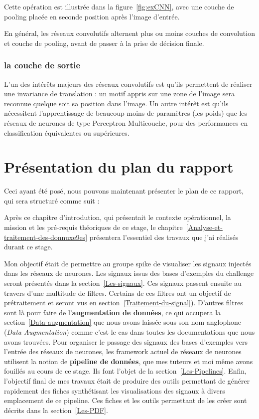 Cette opération est illustrée dans la figure~\ref{fig:exCNN}, avec une couche
de pooling placée en seconde position après l'image d'entrée.

En général, les réseaux convolutifs alternent plus ou moins couches de
convolution et couche de pooling, avant de passer à la prise de décision finale.

\subsubsection{la couche de sortie}



L'un des intérêts majeurs des réseaux convolutifs est qu'ils permettent de
réaliser une invariance de translation :
un motif appris sur une zone de l'image sera reconnue quelque soit sa position
dans l'image.
Un autre intérêt est qu'ils nécessitent l'apprentissage de beaucoup moins de
paramètres (les poids) que les réseaux de neurones de type Perceptron
Multicouche, pour des performances en classification équivalentes ou
supérieures.

\hypertarget{plan}{%
\section{Présentation du plan du rapport}%
\label{Présentation du plan du rapport}}

Ceci ayant été posé, nous pouvons maintenant présenter le plan de ce rapport,
qui sera structuré comme suit :

Après ce chapitre d'introdution, qui présentait le contexte opérationnel, la mission et les pré-requis théoriques de ce stage, le
chapitre~\ref{Analyse-et-traitement-des-donnuxe9es} présentera l'essentiel
des travaux que j'ai réalisés durant ce stage.

Mon objectif était de permettre au groupe spike de visualiser les signaux
injectés dans les réseaux de neurones.
Les signaux issus des bases d'exemples du challenge seront présentés dans la section~\ref{Les-signaux}.
Ces signaux passent ensuite au travers d'une multitude de filtres.
Certains de ces filtres ont un objectif de prétraitement et seront vus en section~\ref{Traitement-du-signal}).
D'autres filtres sont là pour faire de l'\textbf{augmentation de données}, ce
qui occupera la section~\ref{Data-augmentation} que nous avons laissée sous son
nom anglophone (\textit{Data Augmentation}) comme c'est le cas dans toutes les documentations que nous avons
trouvées.
Pour organiser le passage des signaux des bases d'exemples vers l'entrée des réseaux de neurones, les framework actuel de réseaux de neurones utilisent
la notion de \textbf{pipeline de données}, que mes tuteurs et moi même avons
fouillés au cours de ce stage. Ils font l'objet de la
section~\ref{Les-Pipelines}.
Enfin, l'objectif final de mes travaux était de produire des outils permettant
de générer rapidement des fiches synthétisant les visualisations des signaux à divers emplacement de ce pipeline. Ces fiches et les outils permettant de les
créer sont décrits dans la section~\ref{Les-PDF}.

